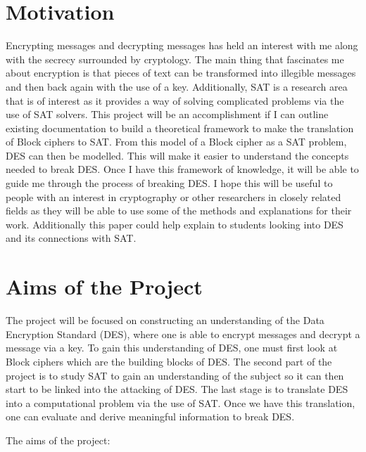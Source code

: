 \documentclass[11pt,a4paper, notitlepage]{report}
\begin{document}
\section{Motivation}
\label{cha:Motivation}

Encrypting messages and decrypting messages has held an interest with me along with the secrecy surrounded by cryptology. The main thing that fascinates me about encryption is that pieces of text can be transformed into illegible messages and then back again with the use of a key. Additionally, SAT is a research area that is of interest as it provides a way of solving complicated problems via the use of SAT solvers.  This project will be an accomplishment if I can outline existing documentation to build a theoretical framework to make the translation of Block ciphers to SAT. From this model of a Block cipher as a SAT problem, DES can then be modelled. This will make it easier to understand the concepts needed to break DES. Once I have this framework of knowledge, it will be able to guide me through the process of breaking DES. I hope this will be useful to people with an interest in cryptography or other researchers in closely related fields as they will be able to use some of the methods and explanations for their work. Additionally this paper could help explain to students looking into DES and its connections with SAT.



\section{Aims of the Project}
\label{cha:Aims}

The project will be focused on constructing an understanding of the Data Encryption Standard (DES), where one is able to encrypt messages and decrypt a message via a key. To gain this understanding of DES, one must first look at Block ciphers which are the building blocks of DES. The second part of the project is to study SAT to gain an understanding of the subject so it can then start to be linked into the attacking of DES. The last stage is to translate DES into a computational problem via the use of SAT. Once we have this translation, one can evaluate and derive meaningful information to break DES. 

The aims of the project:
\end{document}
